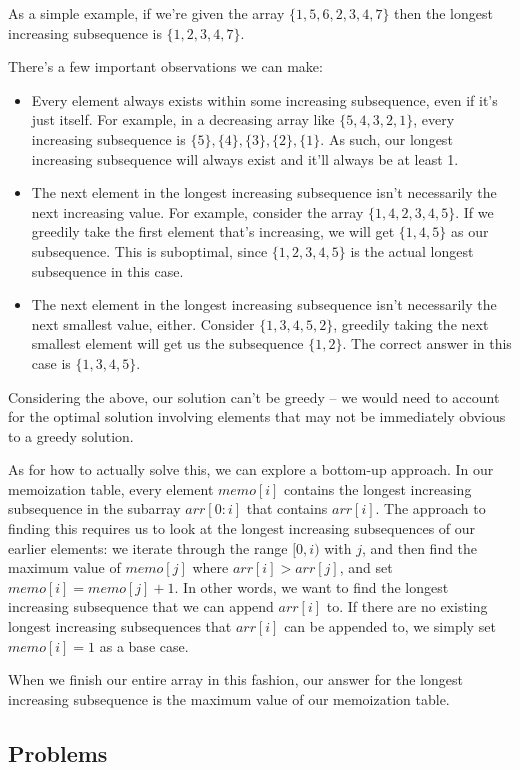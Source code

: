 As a simple example, if we're given the array $\{1,5,6,2,3,4,7\}$ then the longest increasing subsequence is $\{1,2,3,4,7\}$.

There's a few important observations we can make:
\begin{itemize}
\item Every element always exists within some increasing subsequence, even if it's just itself. For example, in a decreasing array like $\{5,4,3,2,1\}$, every increasing subsequence is $\{5\},\{4\},\{3\},\{2\},\{1\}$. As such, our longest increasing subsequence will always exist and it'll always be at least 1.
\item The next element in the longest increasing subsequence isn't necessarily the next increasing value. For example, consider the array $\{1,4,2,3,4,5\}$. If we greedily take the first element that's increasing, we will get $\{1,4,5\}$ as our subsequence. This is suboptimal, since $\{1,2,3,4,5\}$ is the actual longest subsequence in this case.
\item The next element in the longest increasing subsequence isn't necessarily the next smallest value, either. Consider $\{1,3,4,5,2\}$, greedily taking the next smallest element will get us the subsequence $\{1,2\}$. The correct answer in this case is $\{1,3,4,5\}$.
\end{itemize}

Considering the above, our solution can't be greedy -- we would need to account for the optimal solution involving elements that may not be immediately obvious to a greedy solution.

As for how to actually solve this, we can explore a bottom-up approach. In our memoization table, every element $memo[i]$ contains the longest increasing subsequence in the subarray $arr[0:i]$ that contains $arr[i]$. The approach to finding this requires us to look at the longest increasing subsequences of our earlier elements: we iterate through the range $[0,i)$ with $j$, and then find the maximum value of $memo[j]$ where $arr[i] > arr[j]$, and set $memo[i] = memo[j] + 1$. In other words, we want to find the longest increasing subsequence that we can append $arr[i]$ to. If there are no existing longest increasing subsequences that $arr[i]$ can be appended to, we simply set $memo[i] = 1$ as a base case.

When we finish our entire array in this fashion, our answer for the longest increasing subsequence is the maximum value of our memoization table.


\subsection{Problems}



\hrulefill



\hrulefill